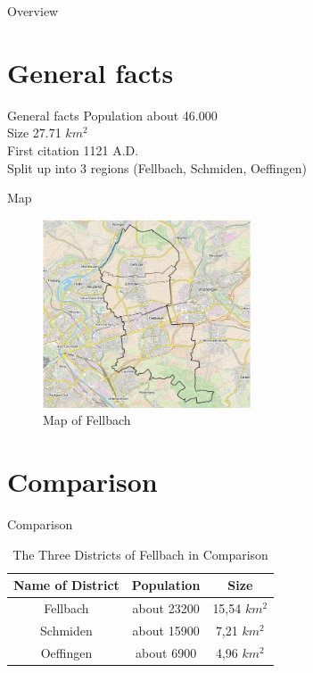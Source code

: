 



\begin{frame}{Overview}
    \tableofcontents
\end{frame}





\section{General facts}

\begin{frame}{General facts}
    Population about 46.000\\
    Size 27.71 $km^2$\\
    First citation 1121 A.D.\\
    Split up into 3 regions (Fellbach, Schmiden, Oeffingen)


\end{frame}

\begin{frame}{Map}


    \begin{figure}
        \centering
        \includegraphics[width=175pt]{gfx/logos/fellbachMap}
        \caption{Map of Fellbach}
        \label{fig:Fellbach}
    \end{figure}
\end{frame}




\section{Comparison}

\begin{frame}{Comparison}
    \begin{table}[!h]
        \centering
        \begin{tabular} {| c | c | c |}
            \hline Name of District & Population & Size\\
            \hline Fellbach & about 23200 & 15,54 $km^2$\\
            \hline Schmiden &  about 15900 & 7,21 $km^2$\\
            \hline Oeffingen & about 6900 & 4,96 $km^2$
        \end{tabular}
        \caption{The Three Districts of Fellbach in Comparison}
        \label{tab:Comparison}
    \end{table}
\end{frame}

